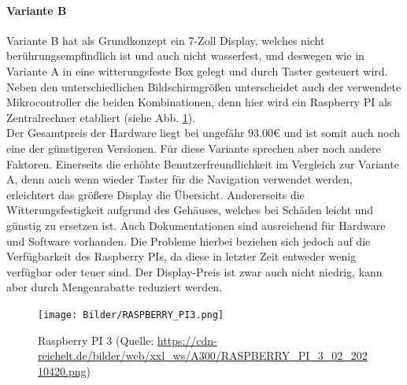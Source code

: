 \paragraph{Variante B}
Variante B hat als Grundkonzept ein 7-Zoll Display, welches nicht berührungsempfindlich ist und auch nicht wasserfest, und deswegen wie in Variante A in eine witterungsfeste Box gelegt und durch Taster gesteuert wird. Neben den unterschiedlichen Bildschirmgrößen unterscheidet auch der verwendete Mikrocontroller die beiden Kombinationen, denn hier wird ein Raspberry PI als Zentralrechner etabliert (siehe Abb. \ref{fig:raspi3}).\\
Der Gesamtpreis der Hardware liegt bei ungefähr 93.00€ und ist somit auch noch eine der günstigeren Versionen. Für diese Variante sprechen aber noch andere Faktoren. Einerseits die erhöhte Benutzerfreundlichkeit im Vergleich zur Variante A, denn auch wenn wieder Taster für die Navigation verwendet werden, erleichtert das größere Display die Übersicht. Andererseits die Witterungsfestigkeit aufgrund des Gehäuses, welches bei Schäden leicht und günstig zu ersetzen ist. Auch Dokumentationen sind ausreichend für Hardware und Software vorhanden. Die Probleme hierbei beziehen sich jedoch auf die Verfügbarkeit des Raspberry PIs, da diese in letzter Zeit entweder wenig verfügbar oder teuer sind. Der Display-Preis ist zwar auch nicht niedrig, kann aber durch Mengenrabatte reduziert werden.
\begin{figure}[ht]
	\centering
	\texttt{[image: Bilder/RASPBERRY\_PI3.png]}
	\caption{Raspberry PI 3 (Quelle: \url{https://cdn-reichelt.de/bilder/web/xxl_ws/A300/RASPBERRY_PI_3_02_20210420.png})}
	\label{fig:raspi3}
\end{figure}
